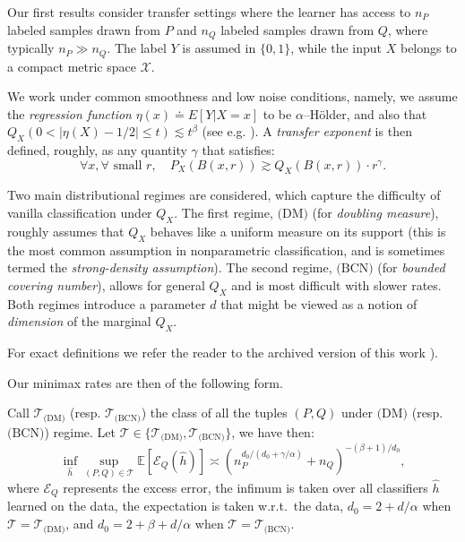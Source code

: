 \documentclass[final,12pt]{colt2018} %
\newcommand{\cBall}[2]{B(#1 , #2 )}
\newcommand{\tJoinProb}{Q}
\newcommand{\sJoinProb}{P}
\newcommand{\featVar}{X}
\newcommand{\tProb}{\tJoinProb_{\featVar}}
\newcommand{\sProb}{\sJoinProb_{\featVar}}
\newcommand{\regFct}{\eta}
\newcommand{\family}{\mathcal{T}}
\newcommand{\dmFam}{\family_{\dm}}
\newcommand{\bcnFam}{\family_{\bcn}}
\newcommand{\sN}{n_{\sJoinProb}}
\newcommand{\tN}{n_{\tJoinProb}}
\newcommand{\exErr}{\mathcal{E}_{\tJoinProb}}
\newcommand{\holderExp}{\alpha}
\newcommand{\tTsyExp}{\beta}
\newcommand{\tCovDim}{d}
\newcommand{\transMarginExp}{\gamma}
\newcommand{\bcn}{\text{(BCN)}}
\newcommand{\dm}{\text{(DM)}}
\newcommand{\rates}{d_0}
\begin{document}
Our first results consider transfer settings where the learner has access to $n_{P}$ labeled samples drawn from $P$ and $n_{Q}$ labeled samples drawn from $Q$, where typically $n_{P} \gg n_{Q}$. The label $Y$ is assumed in $\{0, 1\}$, while the input $X$ belongs to a compact metric space $\mathcal{X}$. 

We work under common smoothness and low noise conditions, namely, we assume the \emph{regression function} $\eta(x) \doteq E[Y|X=x]$ to be $\alpha$--H\"{o}lder, and also that $\tProb \left( 0 < \left| \regFct(\featVar) - 1/2 \right| \leq t \right) \lesssim t^{\tTsyExp}$ (see e.g. \cite{audibert2007fast}). A \emph{transfer exponent} is then defined, roughly, as any quantity $\gamma$ that satisfies:
\begin{equation*} 
\forall x, \forall  \text{ small } r, \quad \sProb(\cBall{x}{r}) \gtrsim \tProb(\cBall{x}{r}) \cdot r^{\transMarginExp}.
\end{equation*}

Two main distributional regimes are considered, which capture the difficulty of vanilla classification under $Q_{X}$. The first regime, $\text{(DM)}$ (for \emph{doubling measure}), roughly assumes that $Q_X$ behaves like a uniform measure on its support (this is the most common assumption in nonparametric classification, and is sometimes termed the \emph{strong-density assumption}). The second regime, $\text{(BCN)}$ (for \emph{bounded covering number}), allows for general $Q_X$ and is most difficult with slower rates. Both regimes 
introduce a parameter $d$ that might be viewed as a notion of \emph{dimension} of the marginal $Q_X$. 

For exact definitions we refer the reader to the archived version of this work \citep{kpotufe2018marginal}). 

Our minimax rates are then of the following form.

\begin{theorem} [Sketch] \label{thm:minimaxLowerBound}
Call $\mathcal{T}_{\text{(DM)}}$ (resp. $\mathcal{T}_{\text{(BCN)}}$) the class of all the tuples $(P,Q)$ under $\text{(DM)}$ (resp. $\text{(BCN)}$) regime. Let $\mathcal{T} \in \{\mathcal{T}_{\text{(DM)}},\mathcal{T}_{\text{(BCN)}}\}$, we have then:
\begin{equation*}
\inf_{\hat{h}}\sup_{(\sJoinProb, \tJoinProb) \in \family} \mathbb{E}[\exErr(\hat h)] \asymp \left( \sN ^{\rates / (\rates + \transMarginExp / \holderExp)} + \tN \right)^{ -(\tTsyExp + 1) / \rates}, 
\end{equation*}
where $\exErr$ represents the excess error, the infimum is taken over all classifiers $\hat{h}$ learned on the data, the expectation is taken w.r.t.~the data, $\rates = 2  + \tCovDim / \holderExp$ when $\family = \dmFam$, and $\rates = 2 + \tTsyExp + \tCovDim / \holderExp$ when $\family = \bcnFam$.
\end{theorem}
\end{document}
